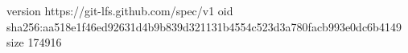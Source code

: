 version https://git-lfs.github.com/spec/v1
oid sha256:aa518e1f46ed92631d4b9b839d321131b4554c523d3a780facb993e0dc6b4149
size 174916
